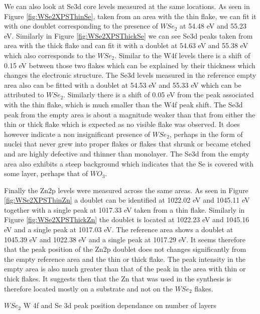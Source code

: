 We can also look at Se3d core levels measured at the same locations. As seen in Figure \ref{fig:WSe2XPSThinSe}, taken from an area with the thin flake, we can fit it with one doublet corresponding to the presence of $WSe_2$ at 54.48 eV and 55.23 eV. Similarly in Figure \ref{fig:WSe2XPSThickSe} we can see Se3d peaks taken from area with the thick flake and can fit it with a doublet at 54.63 eV and 55.38 eV which also corresponds to the $WSe_2$. Similar to the W4f levels there is a shift of 0.15 eV between those two flakes which can be explained by their thickness which changes the electronic structure. The Se3d levels measured in the reference empty area also can be fitted with a doublet at 54.53 eV and 55.33 eV which can be attributed to $WSe_2$. Similarly there is a shift of 0.05 eV from the peak associated with the thin flake, which is much smaller than the W4f peak shift. The Se3d peak from the empty area is about a magnitude weaker than that from either the thin or thick flake which is expected as no visible flake was observed. It does however indicate a non insignificant presence of $WSe_2$, perhaps in the form of nuclei that never grew into proper flakes or flakes that shrunk or became etched and are highly defective and thinner than monolayer. The Se3d from the empty area also exhibits a steep background which indicates that the Se is covered with some layer, perhaps that of $WO_3$. 

Finally the Zn2p levels were measured across the same areas. As seen in Figure \ref{fig:WSe2XPSThinZn} a doublet can be identified at 1022.02 eV and 1045.11 eV together with a single peak at 1017.33 eV taken from a thin flake. Similarly in Figure \ref{fig:WSe2XPSThickZn} the doublet is located at 1022.23 eV and 1045.16 eV and a single peak at 1017.03 eV. The reference area shows a doublet at 1045.39 eV and 1022.38 eV and a single peak at 1017.29 eV. It seems therefore that the peak position of the Zn2p doublet does not changes significantly from the empty reference area and the thin or thick flake. The peak intensity in the empty area is also much greater than that of the peak in the area with thin or thick flakes. It suggests then that the Zn that was used in the synthesis is therefore located mostly on a substrate and not on the $WSe_2$ flakes.

\begin{center}
\begin{table}[H]
\caption{$WSe_2$ W 4f and Se 3d peak position dependance on number of layers}
\label{tab:WSe2XPSTableComparison}
\end{table}
\end{center}

